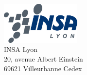 \begin{center}
	\begin{minipage}[t]{0.48\textwidth}
	  \begin{flushleft}
	    \includegraphics [width=40mm]{images/logo_INSA.png} \\[0.5cm]
			INSA Lyon\\
			20, avenue Albert Einstein\\
			69621 Villeurbanne Cedex
	  \end{flushleft}
	\end{minipage}
	\begin{minipage}[t]{0.48\textwidth}
	  \begin{flushright}
	  \end{flushright}
	\end{minipage} \\[2cm]

	\textsc{\Large \reportsubject}\\[0.3cm]
	\HRule \\[0.4cm]
	{\Huge \bfseries \reporttitle}\\[0.6cm]
	{\Large \dateperiod}\\[0.4cm]
	\HRule \\[1cm]


\end{center}
